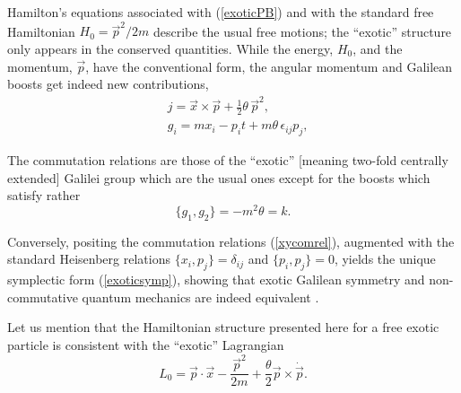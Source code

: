 \documentclass[a4paper,12pt]{article}
\newcommand\half{{\scriptstyle{\frac{1}{2}}}}
\newcommand{\vx}{{\vec x}}
\newcommand{\vp}{{\vec p}}
\begin{document}
Hamilton's equations associated with (\ref{exoticPB}) and with the 
standard free
Hamiltonian $H_{0}=\vp^2/2m$ describe the usual free motions; the 
``exotic'' structure only appears in the conserved quantities.
While the energy,
$H_{0}$, and the momentum, $\vp$, have the conventional form,
the angular momentum and Galilean boosts get indeed new contributions,
\begin{equation}
    \begin{array}{ll}
    &j=\vx\times\vp+\half\theta\,\vp^2,
    \\[4pt]
    &g_{i}=mx_{i}-p_{i}t+m\theta\,\epsilon_{ij}p_{j},
    \end{array}
\label{consquant}
\end{equation}

The commutation relations are those of the ``exotic''
[meaning two-fold centrally extended] Galilei group
which are the usual ones  except for the boosts which satisfy rather
\begin{equation}
    \big\{g_{1}, g_{2}\big\}=-m^2\theta=k.
\end{equation}

Conversely, positing the commutation relations 
(\ref{xycomrel}), augmented with the standard Heisenberg relations 
$\big\{x_{i}, p_{j}\big\}=\delta_{ij}$ and  $\big\{p_{i}, p_{j}\big\}=0$,
yields the unique symplectic form (\ref{exoticsymp}), showing that
exotic Galilean symmetry and non-commutative quantum mechanics are
indeed equivalent \cite{DH}.
     
Let us mention that the Hamiltonian structure presented here
for a free exotic particle is consistent with the ``exotic'' Lagrangian
\begin{equation}
    L_{0}=\vp\cdot\vx-\frac{\vp^2}{2m}+\frac{\theta}{2}\vp\times\dot{\vp}.
    \label{freeexoticlag}
\end{equation}    
    
\end{document}

